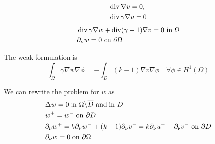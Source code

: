 
\begin{align}
 &\operatorname{div} \nabla v = 0, \\
 &\operatorname{div} \gamma \nabla u = 0
\end{align}
\begin{align}
  &\operatorname{div} \gamma \nabla w + \operatorname{div} (\gamma - 1)\nabla v = 0\textup{ in }\Omega \\
  &\partial_\nu w = 0 \textup{ on }\partial \Omega
\end{align}

The weak formulation is
\begin{equation}
 \int_\Omega \gamma \nabla w\nabla \phi = - \int_D (k-1)\nabla v\nabla \phi 
 \quad \forall\phi \in H^1(\Omega)
\end{equation}

We can rewrite the problem for $w$ as 
\begin{align}
 &\Delta w = 0\textup{ in } \Omega\backslash\overline{D} \textup{ and in }D \\
 & w^+ = w^- \textup{ on }\partial D\\
 & \partial_\nu w^+ = k \partial_\nu w^- + (k-1)\partial_\nu v^- = k\partial_\nu u^- - \partial_\nu v^- \textup{ on }\partial D \\
 & \partial_\nu w = 0 \textup{ on }\partial \Omega
\end{align}

